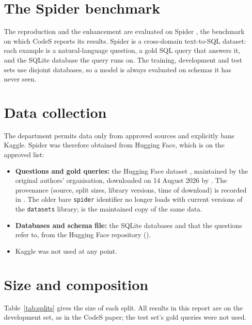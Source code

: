 \section{The Spider benchmark}

The reproduction and the enhancement are evaluated on Spider \cite{yu2018spider}, the benchmark on which CodeS reports its results. Spider is a cross-domain text-to-SQL dataset: each example is a natural-language question, a gold SQL query that answers it, and the SQLite database the query runs on. The training, development and test sets use disjoint databases, so a model is always evaluated on schemas it has never seen.

\section{Data collection}

The department permits data only from approved sources and explicitly bans Kaggle. Spider was therefore obtained from Hugging Face, which is on the approved list:

\begin{itemize}
	\item \textbf{Questions and gold queries:} the Hugging Face dataset , maintained by the original authors' organisation, downloaded on 14 August 2026 by . The provenance (source, split sizes, library versions, time of download) is recorded in . The older bare \texttt{spider} identifier no longer loads with current versions of the \texttt{datasets} library;  is the maintained copy of the same data.
	\item \textbf{Databases and schema file:} the SQLite databases and  that the questions refer to, from the Hugging Face repository  ().
	\item Kaggle was not used at any point.
\end{itemize}

\section{Size and composition}

Table~\ref{tab:splits} gives the size of each split. All results in this report are on the development set, as in the CodeS paper; the test set's gold queries were not used.

